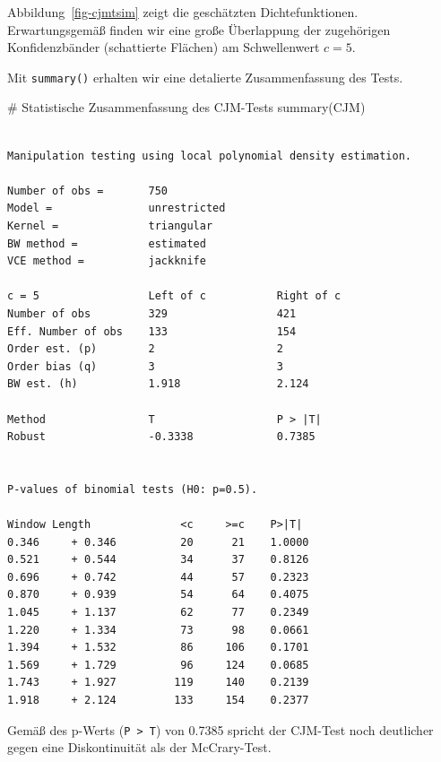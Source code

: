 \documentclass[
  a4paper,
  DIV=11,
  oneside]{scrreprt}
\newenvironment{Shaded}{\begin{snugshade}}{\end{snugshade}}
\newcommand{\CommentTok}[1]{\textcolor[rgb]{0.37,0.37,0.37}{#1}}
\newcommand{\FunctionTok}[1]{\textcolor[rgb]{0.28,0.35,0.67}{#1}}
\newcommand{\NormalTok}[1]{\textcolor[rgb]{0.00,0.23,0.31}{#1}}
\begin{document}
Abbildung~\ref{fig-cjmtsim} zeigt die geschätzten Dichtefunktionen.
Erwartungsgemäß finden wir eine große Überlappung der zugehörigen
Konfidenzbänder (schattierte Flächen) am Schwellenwert \(c=5\).

Mit \texttt{summary()} erhalten wir eine detalierte Zusammenfassung des
Tests.

\begin{Shaded}
\begin{Highlighting}[]
\CommentTok{\# Statistische Zusammenfassung des CJM{-}Tests}
\FunctionTok{summary}\NormalTok{(CJM)}
\end{Highlighting}
\end{Shaded}

\begin{verbatim}

Manipulation testing using local polynomial density estimation.

Number of obs =       750
Model =               unrestricted
Kernel =              triangular
BW method =           estimated
VCE method =          jackknife

c = 5                 Left of c           Right of c          
Number of obs         329                 421                 
Eff. Number of obs    133                 154                 
Order est. (p)        2                   2                   
Order bias (q)        3                   3                   
BW est. (h)           1.918               2.124               

Method                T                   P > |T|             
Robust                -0.3338             0.7385              


P-values of binomial tests (H0: p=0.5).

Window Length              <c     >=c    P>|T|
0.346     + 0.346          20      21    1.0000
0.521     + 0.544          34      37    0.8126
0.696     + 0.742          44      57    0.2323
0.870     + 0.939          54      64    0.4075
1.045     + 1.137          62      77    0.2349
1.220     + 1.334          73      98    0.0661
1.394     + 1.532          86     106    0.1701
1.569     + 1.729          96     124    0.0685
1.743     + 1.927         119     140    0.2139
1.918     + 2.124         133     154    0.2377
\end{verbatim}

Gemäß des p-Werts (\texttt{P\ \textgreater{}\ \textbar{}T\textbar{}})
von 0.7385 spricht der CJM-Test noch deutlicher gegen eine
Diskontinuität als der McCrary-Test.
\end{document}
